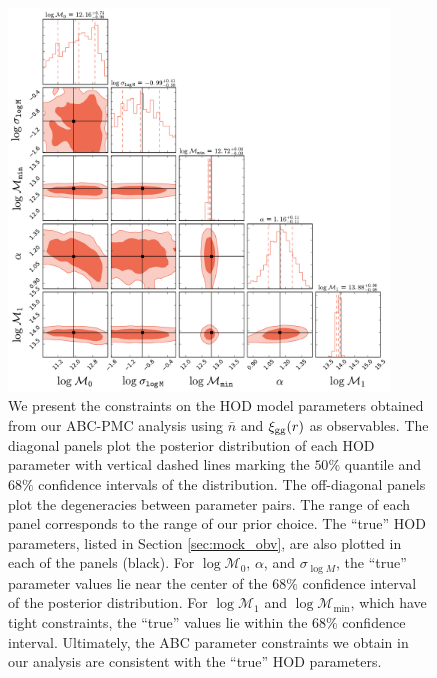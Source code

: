 \begin{figure}
\includegraphics[width=0.9\textwidth]{figs/abc/paper_ABCcorner_nbarxi.pdf}
\caption{\label{fig:abc_corner_nbarxi} We present the constraints on the \citet{zheng07} HOD model parameters obtained from our ABC-PMC analysis using $\bar{n}$ and $\xi_{\mathrm{gg}}(r)$ as observables.  
The diagonal panels plot the posterior distribution of each HOD parameter with 
vertical dashed lines marking the $50\%$ quantile and $68\%$ confidence intervals of the 
distribution. The off-diagonal panels plot the degeneracies between parameter pairs. 
The range of each panel corresponds to the range of our prior choice. The ``true''
HOD parameters, listed in Section \ref{sec:mock_obv}, are also plotted in each of 
the panels (black). For $\log\mathcal{M}_0$, $\alpha$, and $\sigma_{\log M}$, 
the ``true'' parameter values lie near the center of the $68\%$ confidence interval 
of the posterior distribution. For $\log\mathcal{M}_1$ and $\log\mathcal{M}_\mathrm{min}$, 
which have tight constraints, the ``true'' values lie within the $68\%$ confidence 
interval. Ultimately, the ABC parameter constraints we obtain in our analysis are consistent with the ``true'' HOD parameters.}
\end{figure}

